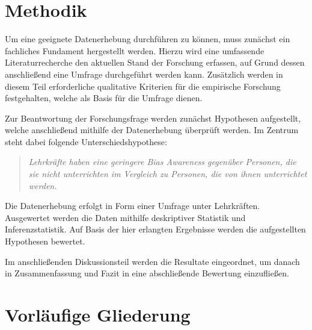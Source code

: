 \documentclass[11pt, a4paper]{article}
\begin{document}
\section{Methodik}

Um eine geeignete Datenerhebung durchführen zu können, muss zunächst ein fachliches Fundament hergestellt werden.
Hierzu wird eine umfassende Literaturrecherche den aktuellen Stand der Forschung erfassen, auf Grund dessen anschließend eine Umfrage durchgeführt werden kann.
Zusätzlich werden in diesem Teil erforderliche qualitative Kriterien für die empirische Forschung festgehalten, welche als Basis für die Umfrage dienen.

Zur Beantwortung der Forschungsfrage werden zunächst Hypothesen aufgestellt, welche anschließend mithilfe der Datenerhebung überprüft werden.
Im Zentrum steht dabei folgende Unterschiedshypothese:
\begin{quote}
	\itshape
	Lehrkräfte haben eine geringere Bias Awareness gegenüber Personen, die sie nicht unterrichten im Vergleich zu Personen, die von ihnen unterrichtet werden.
\end{quote}

Die Datenerhebung erfolgt in Form einer Umfrage unter Lehrkräften.
Ausgewertet werden die Daten mithilfe deskriptiver Statistik und Inferenzstatistik.
Auf Basis der hier erlangten Ergebnisse werden die aufgestellten Hypothesen bewertet.

Im anschließenden Diskussionsteil werden die Resultate eingeordnet, um danach in Zusammenfassung und Fazit in eine abschließende Bewertung einzufließen.


\section{Vorläufige Gliederung}
\end{document}
